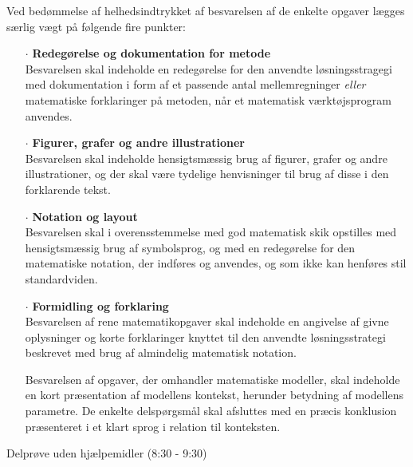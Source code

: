 \documentclass[12pt,x11names,a4paper]{article}
\begin{document}
Ved bedømmelse af helhedsindtrykket af besvarelsen af de enkelte opgaver lægges særlig vægt på følgende fire punkter:
\begin{itemize}
\item[$\cdot$] \textbf{Redegørelse og dokumentation for metode} \\
Besvarelsen skal indeholde en redegørelse for den anvendte løsningsstragegi med dokumentation i form af et passende antal mellemregninger \textit{eller} matematiske forklaringer på metoden, når et matematisk værktøjsprogram anvendes.
\item[$\cdot$] \textbf{Figurer, grafer og andre illustrationer} \\
Besvarelsen skal indeholde hensigtsmæssig brug af figurer, grafer og andre illustrationer, og der skal være tydelige henvisninger til brug af disse i den forklarende tekst.
\item[$\cdot$] \textbf{Notation og layout}\\
Besvarelsen skal i overensstemmelse med god matematisk skik opstilles med hensigtsmæssig brug af symbolsprog, og med en redegørelse for den matematiske notation, der indføres og anvendes, og som ikke kan henføres stil standardviden.
\item[$\cdot$] \textbf{Formidling og forklaring}\\
Besvarelsen af rene matematikopgaver skal indeholde en angivelse af givne oplysninger og korte forklaringer knyttet til den anvendte løsningsstrategi beskrevet med brug af almindelig matematisk notation. 

Besvarelsen af opgaver, der omhandler matematiske modeller, skal indeholde en kort præsentation af modellens kontekst, herunder betydning af modellens parametre. De enkelte delspørgsmål skal afsluttes med en præcis konklusion præsenteret i et klart sprog i relation til konteksten.
\end{itemize}

\newpage

\begin{center}
\LARGE
Delprøve uden hjælpemidler (8:30 - 9:30)
\end{center}
\end{document}
